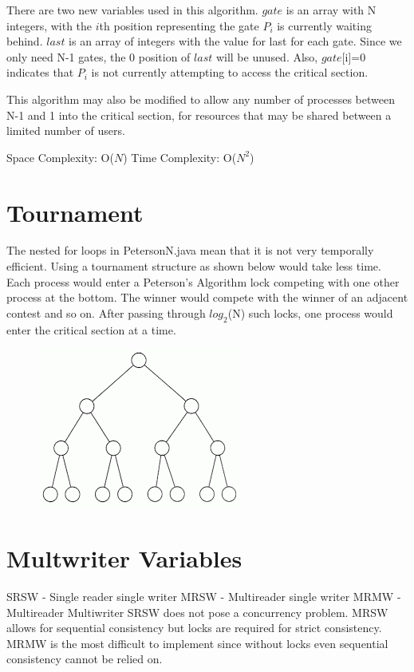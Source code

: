 \documentclass[twoside]{article}
\begin{document}
There are two new variables used in this algorithm.  $gate$ is an array with N integers, with the $i$th position representing the gate $P_i$ is currently waiting behind.  $last$ is an array of integers with the value for last for each gate.  Since we only need N-1 gates, the 0 position of $last$ will be unused.  Also, $gate$[i]=0 indicates that $P_i$ is not currently attempting to access the critical section.

This algorithm may also be modified to allow any number of processes between N-1 and 1 into the critical section, for resources that may be shared between a limited number of users.

Space Complexity: O($N$)
Time Complexity: O($N^2$)

\section{Tournament}
The nested for loops in PetersonN.java mean that it is not very temporally efficient.  Using a tournament structure as shown below would take less time.  Each process would enter a Peterson's Algorithm lock competing with one other process at the bottom.  The winner would compete with the winner of an adjacent contest and so on.  After passing through $log_2$(N) such locks, one process would enter the critical section at a time.
\begin{figure}[h]
\includegraphics[scale=.5]{binarytree}
\centering
\end{figure}
\section{Multwriter Variables}
SRSW - Single reader single writer\newline
MRSW - Multireader single writer\newline
MRMW - Multireader Multiwriter\newline\newline
SRSW does not pose a concurrency problem.  MRSW allows for sequential consistency but locks are required for strict consistency.  MRMW is the most difficult to implement since without locks even sequential consistency cannot be relied on.
\end{document}
